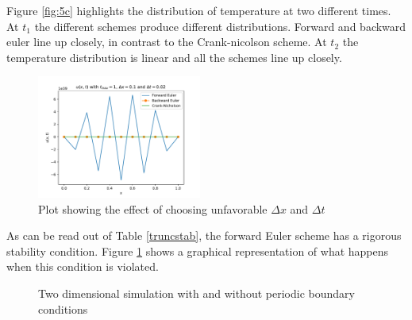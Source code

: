 \documentclass[10pt,a4paper]{article}
\begin{document}
\noindent Figure \ref{fig:5c} highlights the distribution of temperature at two different times. At $t_1$ the different schemes produce different distributions. Forward and backward euler line up closely, in contrast to the Crank-nicolson scheme. At $t_2$ the temperature distribution is linear and all the schemes line up closely. 

\begin{figure} [H]
	\centering
	\includegraphics[width=0.48\textwidth]{../plots/unstable.pdf}
	\caption{\label{fig:unstable} Plot showing the effect of choosing unfavorable $\Delta x$ and $\Delta t$}
\end{figure}

\noindent As can be read out of Table \ref{truncstab}, the forward Euler scheme has a rigorous stability condition. Figure \ref{fig:unstable} shows a graphical representation of what happens when this condition is violated. 

\begin{figure} [H]
	\centering
	\caption{\label{fig:5d} Two dimensional simulation with and without periodic boundary conditions}
\end{figure}
\end{document}
